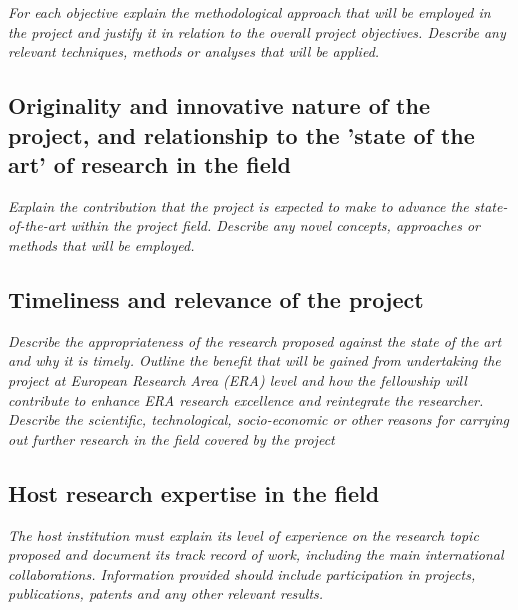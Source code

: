 \documentclass[a4paper,11pt]{article}
\newenvironment{xcomment}{\em}{}
\begin{document}
\begin{xcomment}
For each objective explain the methodological approach that will be employed in the project and
justify it in relation to the overall project objectives. Describe any relevant techniques, methods or
analyses that will be applied.
\end{xcomment}

\subsection{Originality and innovative nature of the project, and relationship to the 'state of the art' of research in the field}

\begin{xcomment}
Explain the contribution that the project is expected to make to advance the state-of-the-art within
the project field. Describe any novel concepts, approaches or methods that will be employed.
\end{xcomment}

\subsection{Timeliness and relevance of the project}

\begin{xcomment}
Describe the appropriateness of the research proposed against the state of the art and why it is
timely. Outline the benefit that will be gained from undertaking the project at European Research
Area (ERA) level and how the fellowship will contribute to enhance ERA research excellence and
reintegrate the researcher. Describe the scientific, technological, socio-economic or other
reasons for carrying out further research in the field covered by the project
\end{xcomment}

\subsection{Host research expertise in the field}

\begin{xcomment}
The host institution must explain its level of experience on the research topic proposed and
document its track record of work, including the main international collaborations. Information
provided should include participation in projects, publications, patents and any other relevant
results. 
\end{xcomment}
\end{document}
